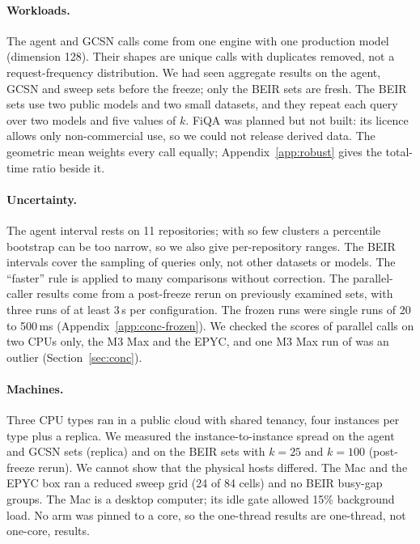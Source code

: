\paragraph{Workloads.}
The agent and GCSN calls come from one engine with one production model (dimension 128).
Their shapes are unique calls with duplicates removed, not a request-frequency distribution.
We had seen aggregate results on the agent, GCSN and sweep sets before the freeze; only the BEIR sets are fresh.
The BEIR sets use two public models and two small datasets, and they repeat each query over two models and five values of $k$.
FiQA was planned but not built: its licence allows only non-commercial use, so we could not release derived data.
The geometric mean weights every call equally; Appendix~\ref{app:robust} gives the total-time ratio beside it.

\paragraph{Uncertainty.}
The agent interval rests on 11 repositories; with so few clusters a percentile bootstrap can be too narrow, so we also give per-repository ranges.
The BEIR intervals cover the sampling of queries only, not other datasets or models.
The ``faster'' rule is applied to many comparisons without correction.
The parallel-caller results come from a post-freeze rerun on previously examined sets, with three runs of at least 3\,s per configuration.
The frozen runs were single runs of 20 to 500\,ms (Appendix~\ref{app:conc-frozen}).
We checked the scores of parallel calls on two CPUs only, the M3 Max and the EPYC, and one M3 Max run of \sweet was an outlier (Section~\ref{sec:conc}).

\paragraph{Machines.}
Three CPU types ran in a public cloud with shared tenancy, four instances per type plus a replica.
We measured the instance-to-instance spread on the agent and GCSN sets (replica) and on the BEIR sets with $k = 25$ and $k = 100$ (post-freeze rerun).
We cannot show that the physical hosts differed.
The Mac and the EPYC box ran a reduced sweep grid (24 of 84 cells) and no BEIR busy-gap groups.
The Mac is a desktop computer; its idle gate allowed 15\% background load.
No arm was pinned to a core, so the one-thread results are one-thread, not one-core, results.

